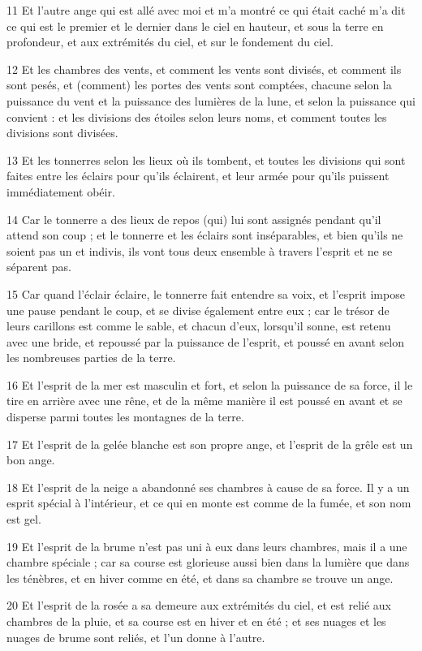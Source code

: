 \par 11 Et l'autre ange qui est allé avec moi et m'a montré ce qui était caché m'a dit ce qui est le premier et le dernier dans le ciel en hauteur, et sous la terre en profondeur, et aux extrémités du ciel, et sur le fondement du ciel.
\par 12 Et les chambres des vents, et comment les vents sont divisés, et comment ils sont pesés, et (comment) les portes des vents sont comptées, chacune selon la puissance du vent et la puissance des lumières de la lune, et selon la puissance qui convient : et les divisions des étoiles selon leurs noms, et comment toutes les divisions sont divisées.
\par 13 Et les tonnerres selon les lieux où ils tombent, et toutes les divisions qui sont faites entre les éclairs pour qu'ils éclairent, et leur armée pour qu'ils puissent immédiatement obéir.
\par 14 Car le tonnerre a des lieux de repos (qui) lui sont assignés pendant qu'il attend son coup ; et le tonnerre et les éclairs sont inséparables, et bien qu'ils ne soient pas un et indivis, ils vont tous deux ensemble à travers l'esprit et ne se séparent pas.
\par 15 Car quand l'éclair éclaire, le tonnerre fait entendre sa voix, et l'esprit impose une pause pendant le coup, et se divise également entre eux ; car le trésor de leurs carillons est comme le sable, et chacun d'eux, lorsqu'il sonne, est retenu avec une bride, et repoussé par la puissance de l'esprit, et poussé en avant selon les nombreuses parties de la terre.
\par 16 Et l'esprit de la mer est masculin et fort, et selon la puissance de sa force, il le tire en arrière avec une rêne, et de la même manière il est poussé en avant et se disperse parmi toutes les montagnes de la terre.
\par 17 Et l'esprit de la gelée blanche est son propre ange, et l'esprit de la grêle est un bon ange.
\par 18 Et l'esprit de la neige a abandonné ses chambres à cause de sa force. Il y a un esprit spécial à l'intérieur, et ce qui en monte est comme de la fumée, et son nom est gel.
\par 19 Et l'esprit de la brume n'est pas uni à eux dans leurs chambres, mais il a une chambre spéciale ; car sa course est glorieuse aussi bien dans la lumière que dans les ténèbres, et en hiver comme en été, et dans sa chambre se trouve un ange.
\par 20 Et l'esprit de la rosée a sa demeure aux extrémités du ciel, et est relié aux chambres de la pluie, et sa course est en hiver et en été ; et ses nuages ​​et les nuages ​​de brume sont reliés, et l'un donne à l'autre.
